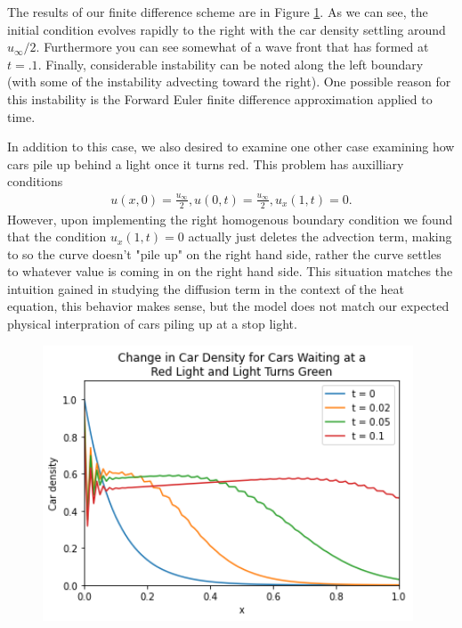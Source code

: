 \documentclass[12pt]{article}
\begin{document}
    The results of our finite difference scheme are in Figure \ref{fig:Red_to_green}.  As we can see, the initial condition evolves rapidly to the right with the car density settling around $u_\infty / 2$. Furthermore you can see somewhat of a wave front that has formed at $t = .1$. Finally, considerable instability can be noted along the left boundary (with some of the instability advecting toward the right). One possible reason for this instability is the Forward Euler finite difference approximation applied to time. 
    
    In addition to this case, we also desired to examine one other case examining how cars pile up behind a light once it turns red. This problem has auxilliary conditions 
    \begin{align*}
        u(x, 0) = \frac{u_\infty}{2}, u(0, t) = \frac{u_\infty}{2}, u_x(1, t) = 0.
    \end{align*}
    However, upon implementing the right homogenous boundary condition we found that the condition $u_x(1, t) = 0$ actually just deletes the advection term, making to so the curve doesn't "pile up" on the right hand side, rather the curve settles to whatever value is coming in on the right hand side. This situation matches the intuition gained in studying the diffusion term in the context of the heat equation, this behavior makes sense, but the model does not match our expected physical interpration of cars piling up at a stop light. 
    
    \begin{figure}[htp]
        \centering
        \includegraphics[width=11cm]{figures/Red_to_Green.png}
        \caption{}
        \label{fig:Red_to_green}
    \end{figure}
    
\end{document}
